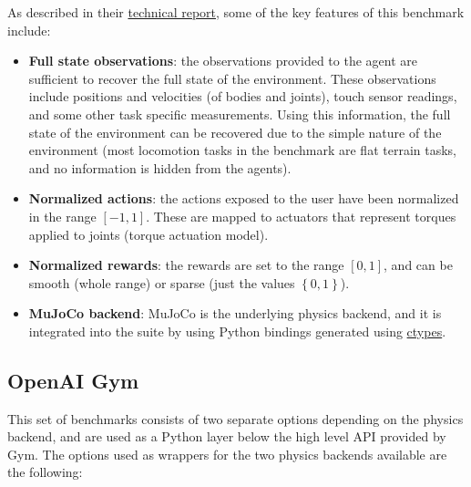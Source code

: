 \figBenchmarkControlSuite

As described in their \href{https://arxiv.org/pdf/1801.00690.pdf}{technical report},
some of the key features of this benchmark include:

\begin{itemize}
    \item \textbf{Full state observations}: the observations provided to the agent
          are sufficient to recover the full state of the environment. These observations
          include positions and velocities (of bodies and joints), touch sensor readings,
          and some other task specific measurements. Using this information, the full state
          of the environment can be recovered due to the simple nature of the environment 
          (most locomotion tasks in the benchmark are flat terrain tasks, and no information
          is hidden from the agents).

    \item \textbf{Normalized actions}: the actions exposed to the user have been normalized 
          in the range $\left[-1,1\right]$. These are mapped to actuators that represent
          torques applied to joints (torque actuation model).

    \item \textbf{Normalized rewards}: the rewards are set to the range $\left[ 0, 1 \right]$, 
          and can be smooth (whole range) or sparse (just the values $\left\{0,1\right\}$).

    \item \textbf{MuJoCo backend}: MuJoCo is the underlying physics backend, and it is
          integrated into the suite by using Python bindings generated using 
          \href{https://github.com/deepmind/dm_control/blob/master/dm_control/autowrap/autowrap.py}{ctypes}.
\end{itemize}

\subsection{OpenAI Gym}

This set of benchmarks consists of two separate options depending on the physics 
backend, and are used as a Python layer below the high level API provided by Gym.
The options used as wrappers for the two physics backends available are the following:

